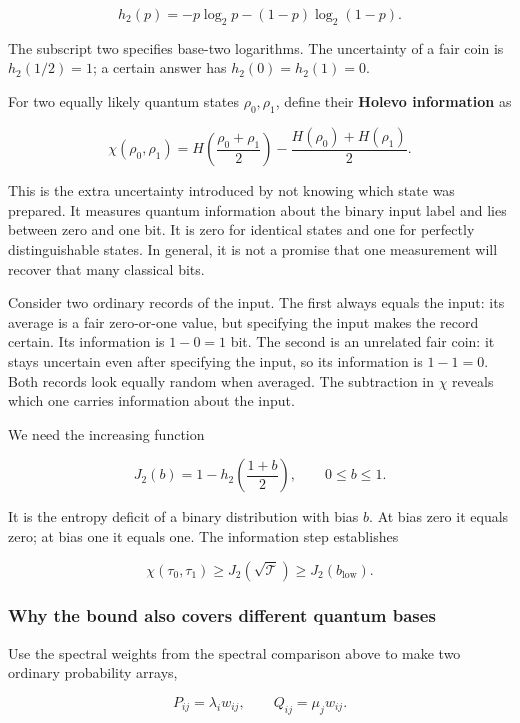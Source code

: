 \documentclass[11pt,letterpaper]{article}
\begin{document}
\[h_{2}(p) = - p\log_{2}p - (1 - p)\log_{2}(1 - p).\]

The subscript two specifies base-two logarithms. The uncertainty of a fair coin is \(h_{2}(1/2) = 1\); a certain answer has \(h_{2}(0) = h_{2}(1) = 0\).

For two equally likely quantum states \(\rho_{0},\rho_{1}\), define their \textbf{Holevo information} as

\[\chi\left( \rho_{0},\rho_{1} \right) = H\left( \frac{\rho_{0} + \rho_{1}}{2} \right) - \frac{H\left( \rho_{0} \right) + H\left( \rho_{1} \right)}{2}.\]

This is the extra uncertainty introduced by not knowing which state was prepared. It measures quantum information about the binary input label and lies between zero and one bit. It is zero for identical states and one for perfectly distinguishable states. In general, it is not a promise that one measurement will recover that many classical bits.

Consider two ordinary records of the input. The first always equals the input: its average is a fair zero-or-one value, but specifying the input makes the record certain. Its information is \(1 - 0 = 1\) bit. The second is an unrelated fair coin: it stays uncertain even after specifying the input, so its information is \(1 - 1 = 0\). Both records look equally random when averaged. The subtraction in \(\chi\) reveals which one carries information about the input.

We need the increasing function

\[J_{2}(b) = 1 - h_{2}\left( \frac{1 + b}{2} \right),\quad\quad 0 \leq b \leq 1.\]

It is the entropy deficit of a binary distribution with bias \(b\). At bias zero it equals zero; at bias one it equals one. The information step establishes

\[\chi\left( \tau_{0},\tau_{1} \right) \geq J_{2}\left( \sqrt{\mathcal{T}} \right) \geq J_{2}\left( b_{\mathrm{low}} \right).\]

\subsubsection{Why the bound also covers different quantum bases}\label{why-the-bound-also-covers-different-quantum-bases}

Use the spectral weights from the spectral comparison above to make two ordinary probability arrays,

\[P_{ij} = \lambda_{i}w_{ij},\quad\quad Q_{ij} = \mu_{j}w_{ij}.\]
\end{document}
